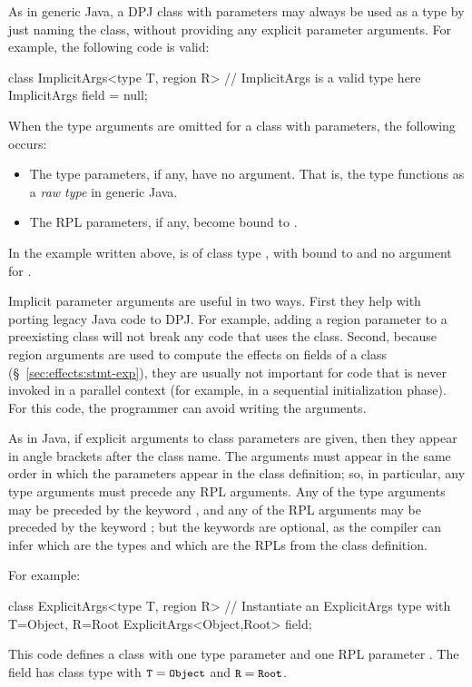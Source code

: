   As in generic Java, a DPJ class
with parameters may always be used as a type by just naming the class,
without providing any explicit parameter arguments.  For example, the
following code is valid:
%
\begin{dpjlisting}
class ImplicitArgs<type T, region R> {
    // ImplicitArgs is a valid type here
    ImplicitArgs field = null;
}
\end{dpjlisting}
%

When the type arguments are omitted for a class with parameters, the
following occurs:
%
\begin{itemize}
%
\item The type parameters, if any, have no argument.  That is, the
  type functions as a \emph{raw type} in generic Java.
%
\item The RPL parameters, if any, become bound to .
%
\end{itemize}
%
In the example written above,  is of class type
, with  bound to  and no
argument for .

Implicit parameter arguments are useful in two ways.  First they help
with porting legacy Java code to DPJ.  For example, adding a region
parameter to a preexisting class will not break any code that uses the
class.  Second, because region arguments are used to compute the
effects on fields of a class (\S~\ref{sec:effects:stmt-exp}), they are
usually not important for code that is never invoked in a parallel
context (for example, in a sequential initialization phase).  For this
code, the programmer can avoid writing the arguments.

 As in Java, if explicit
arguments to class parameters are given, then they appear in angle
brackets after the class name.  The arguments must appear in the same
order in which the parameters appear in the class definition; so, in
particular, any type arguments must precede any RPL arguments.  Any of
the type arguments may be preceded by the keyword , and any
of the RPL arguments may be preceded by the keyword ; but
the keywords are optional, as the compiler can infer which are the
types and which are the RPLs from the class definition.

For example:
%
\begin{dpjlisting}
class ExplicitArgs<type T, region R> {
    // Instantiate an ExplicitArgs type with T=Object, R=Root
    ExplicitArgs<Object,Root> field;
}
\end{dpjlisting}
%
This code defines a class  with one type parameter
 and one RPL parameter .  The field  has
class type  with $\mbox{\small{\texttt{T}}}=\mbox{\small{\texttt{Object}}}$ and
$\mbox{\small{\texttt{R}}}=\mbox{\small{\texttt{Root}}}$.

